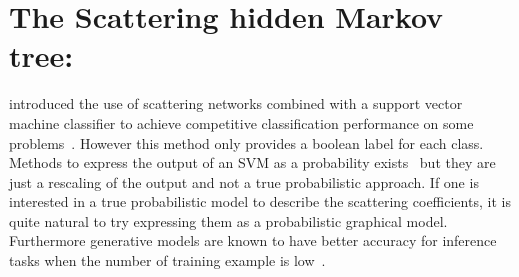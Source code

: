 \documentclass{article}
\begin{document}

\section{The Scattering hidden Markov tree:}
\label{sec:SCHMT}

  \cite{Mallat ST} introduced the use of scattering networks combined with a support vector machine classifier to achieve competitive classification performance on some problems~\cite{bruna}. However this method only provides a boolean label for each class. Methods to express the output of an SVM as a probability exists~\cite{platt1999probabilistic} but they are just a rescaling of the output and not a true probabilistic approach. If one is interested in a true probabilistic model to describe the scattering coefficients, it is quite natural to try expressing them as a probabilistic graphical model. Furthermore generative models are known to have better accuracy for inference tasks when the number of training example is low~\cite{jordan2002discriminative}. \\
  
\end{document}
